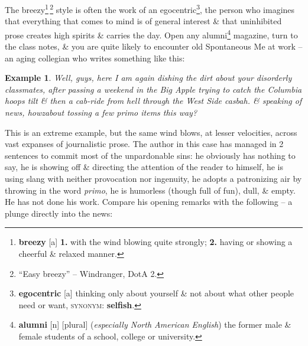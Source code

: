\documentclass[oneside]{book}
\numberwithin{equation}{section}
\newtheorem{example}{Example}[chapter]
\begin{document}
The breezy\footnote{\textbf{breezy} [a] \textbf{1.} with the wind blowing quite strongly; \textbf{2.} having or showing a cheerful \& relaxed manner.}\,\footnote{``Easy breezy'' -- Windranger, DotA 2.} style is often the work of an egocentric\footnote{\textbf{egocentric} [a] thinking only about yourself \& not about what other people need or want, \textsc{synonym}: \textbf{selfish}.}, the person who imagines that everything that comes to mind is of general interest \& that uninhibited prose creates high spirits \& carries the day. Open any alumni\footnote{\textbf{alumni} [n] [plural] (\textit{especially North American English}) the former male \& female students of a school, college or university.} magazine, turn to the class notes, \& you are quite likely to encounter old Spontaneous Me at work -- an aging collegian who writes something like this:

\begin{example}
	Well, guys, here I am again dishing the dirt about your disorderly classmates, after passing a weekend in the Big Apple trying to catch the Columbia hoops tilt \& then a cab-ride from hell through the West Side casbah. \& speaking of news, howzabout tossing a few primo items this way?
\end{example}
This is an extreme example, but the same wind blows, at lesser velocities, across vast expanses of journalistic prose. The author in this case has managed in 2 sentences to commit most of the unpardonable sins: he obviously has nothing to say, he is showing off \& directing the attention of the reader to himself, he is using slang with neither provocation nor ingenuity, he adopts a patronizing air by throwing in the word \textit{primo}, he is humorless (though full of fun), dull, \& empty. He has not done his work. Compare his opening remarks with the following -- a plunge directly into the news:
\end{document}
